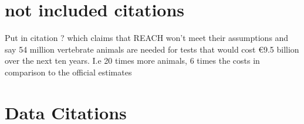 \documentclass[english]{article}
\begin{document}



\section*{not included citations}
Put in citation \citep{hartung_chemical_2009} ? which claims that REACH won't meet their assumptions and say 54 million vertebrate animals are needed for tests that would cost €9.5 billion over the next ten years. I.e 20 times more animals, 6 times the costs in comparison to the official estimates 


\section*{Data Citations}
\end{document}
